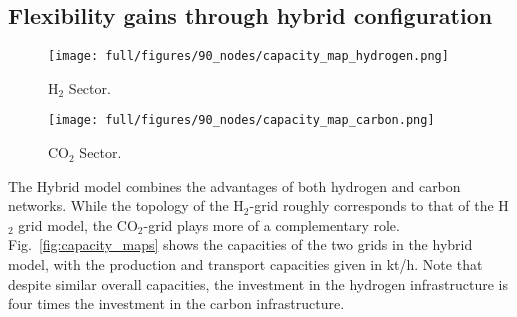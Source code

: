 \documentclass[twocolumn]{article}
\newcommand{\carbon}{CO$_2$}
\newcommand{\hydrogen}{H$_2$}
\begin{document}
\subsection*{Flexibility gains through hybrid configuration}

\begin{figure*}[ht!]
    \centering
    \begin{subfigure}{.49\textwidth}
        \centering
        \texttt{[image: full/figures/90\_nodes/capacity\_map\_hydrogen.png]}
        \caption{\hydrogen{} Sector.}
        \label{fig:capacity_map_hydrogen_co2}
    \end{subfigure}
    \hfill
    \begin{subfigure}{.49\textwidth}
        \centering
        \texttt{[image: full/figures/90\_nodes/capacity\_map\_carbon.png]}
        \caption{\carbon{} Sector.}
        \label{fig:capacity_map_carbon_co2}
    \end{subfigure}%
    \caption{Optimal production and transport capacities of the carbon and hydrogen sector in a net-zero energy system in Europe with both \carbon{} and \hydrogen{} network expansion (Hybrid).
    }
    \label{fig:capacity_maps}
\end{figure*}


The Hybrid model combines the advantages of both hydrogen and carbon networks. While the topology of the \hydrogen{}-grid roughly corresponds to that of the \hydrogen{} grid model, the \carbon{}-grid plays more of a complementary role. Fig.~\ref{fig:capacity_maps} shows the capacities of the two grids in the hybrid model, with the production and transport capacities given in kt/h. Note that despite similar overall capacities, the investment in the hydrogen infrastructure is four times the investment in the carbon infrastructure.
\end{document}
